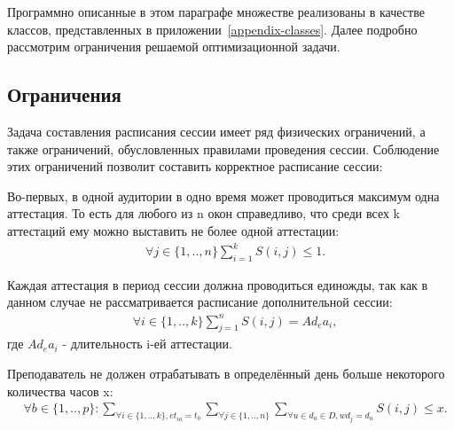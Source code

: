 Программно описанные в этом параграфе множестве реализованы в качестве классов, представленных в приложении~\ref{appendix-classes}. Далее подробно рассмотрим ограничения решаемой оптимизационной задачи.

\subsection{Ограничения}\label{subsec:constraints}
Задача составления расписания сессии имеет ряд физических ограничений, а также ограничений, обусловленных правилами проведения сессии. Соблюдение этих ограничений позволит составить корректное расписание сессии:


Во-первых, в одной аудитории в одно время может проводиться максимум одна аттестация. То есть для любого из n окон справедливо, что среди всех k аттестаций ему можно выставить не более одной аттестации:
\begin{align}
	& \forall  j \in \{1,..,n\} \sum_{i=1}^kS(i,j) \leq 1.
\end{align}


Каждая аттестация в период сессии должна проводиться единожды, так как в данном случае не рассматривается расписание дополнительной сессии:
\begin{align}
	& \forall  i \in \{1,..,k\} \sum_{j=1}^nS(i,j) = Ad_ea_i,
\end{align}
где $Ad_ea_i$ - длительность i-ей аттестации.

Преподаватель не должен отрабатывать в определённый день больше некоторого количества часов x:
\begin{align}
	& \forall b \in \{1,..,p\} : \sum_{\forall i \in \{1,..,k\}, et_{ia}=t_b}\sum_{\forall j \in \{1,..,n\}}\sum_{ \forall u \in d_u \in D, wd_j = d_u }S(i,j) \leq x.
\end{align}

